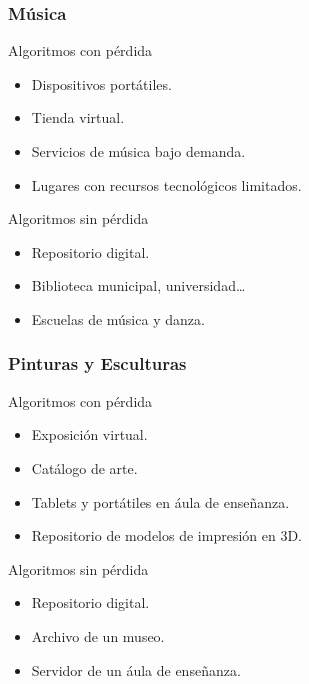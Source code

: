 \documentclass{beamer}
\begin{document}
\begin{frame}
    \frametitle{Música}
    \begin{block}{Algoritmos con pérdida}
        \begin{itemize}
            \item Dispositivos portátiles.
            \item Tienda virtual.
            \item Servicios de música bajo demanda.
            \item Lugares con recursos tecnológicos limitados.
        \end{itemize}
    \end{block}
    \begin{exampleblock}{Algoritmos sin pérdida}
        \begin{itemize}
            \item Repositorio digital.
            \item Biblioteca municipal, universidad\dots
            \item Escuelas de música y danza.
        \end{itemize}
    \end{exampleblock}
\end{frame}

\begin{frame}
    \frametitle{Pinturas y Esculturas}
    \begin{block}{Algoritmos con pérdida}
        \begin{itemize}
            \item Exposición virtual.
            \item Catálogo de arte.
            \item Tablets y portátiles en áula de enseñanza.
            \item Repositorio de modelos de impresión en 3D.
        \end{itemize}
    \end{block}
    \begin{exampleblock}{Algoritmos sin pérdida}
        \begin{itemize}
            \item Repositorio digital.
            \item Archivo de un museo.
            \item Servidor de un áula de enseñanza.
        \end{itemize}
    \end{exampleblock}
\end{frame}
\end{document}
